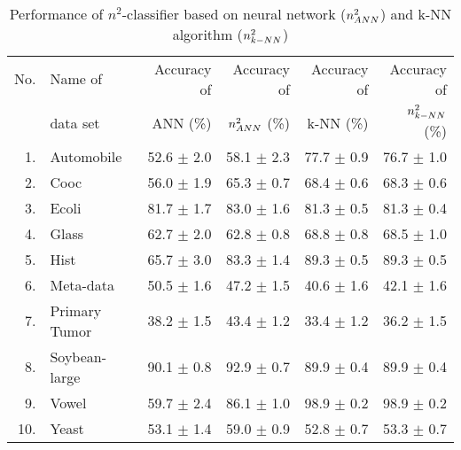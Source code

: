 \documentclass{article}
\begin{document}
\begin{table}
\caption{Performance of $n^2$-classifier based on neural network ($n^2_{\tiny ANN}$)
and k-NN algorithm ($n^2_{\tiny k-NN}$)}
\vspace{2pt}
\begin{tabular}{rlrrrr}
\hline
No. & Name of &\quad Accuracy of & Accuracy of \quad& \quad Accuracy of & Accuracy of  \\
 &data set &\quad ANN  (\%)  & $n^2_{\tiny ANN}$ (\%) & k-NN (\%) & $n^2_{\tiny k-NN}$ (\%) \\
\hline
1. & Automobile & 52.6 \scriptsize{$\pm$  2.0} & 58.1 \scriptsize{$\pm$  2.3 }&
77.7 \scriptsize{$\pm$  0.9} & 76.7 \scriptsize{$\pm$ 1.0}\\
2. & Cooc & 56.0 \scriptsize{$\pm$  1.9} & 65.3 \scriptsize{$\pm$  0.7}  &
68.4 \scriptsize{$\pm$ 0.6} & 68.3 \scriptsize{$\pm$ 0.6 } \\
3. & Ecoli & 81.7 \scriptsize{$\pm$  1.7} & 83.0 \scriptsize{$\pm$  1.6} &
81.3 \scriptsize{$\pm$ 0.5} & 81.3 \scriptsize{$\pm$ 0.4 } \\
4. & Glass & 62.7 \scriptsize{$\pm$  2.0} & 62.8 \scriptsize{$\pm$  0.8}
 & 68.8 \scriptsize{$\pm$  0.8} & 68.5 \scriptsize{$\pm$ 1.0}  \\
5. & Hist & 65.7 \scriptsize{$\pm$  3.0} & 83.3 \scriptsize{$\pm$  1.4} &
89.3 \scriptsize{$\pm$  0.5 }& 89.3 \scriptsize{$\pm$  0.5} \\
6. & Meta-data & 50.5  \scriptsize{$\pm$  1.6 }& 47.2 \scriptsize{$\pm$  1.5} &
 40.6 \scriptsize{$\pm$ 1.6 }& 42.1 \scriptsize{$\pm$  1.6 }\\
7. & Primary Tumor &  38.2 \scriptsize{$\pm$  1.5 }& 43.4 \scriptsize{$\pm$ 1.2} &
 33.4 \scriptsize{$\pm$ 1.2 }& 36.2 \scriptsize{$\pm$  1.5 } \\
8. & Soybean-large & 90.1 \scriptsize{$\pm$  0.8 }& 92.9 \scriptsize{$\pm$  0.7} &
 89.9 \scriptsize{$\pm$  0.4} & 89.9 \scriptsize{$\pm$  0.4 } \\
9. & Vowel & 59.7 \scriptsize{$\pm$  2.4} & 86.1 \scriptsize{$\pm$  1.0 }&
 98.9 \scriptsize{$\pm$  0.2 }&    98.9 \scriptsize{$\pm$  0.2 } \\
10. & Yeast &  53.1 \scriptsize{$\pm$  1.4 }& 59.0 \scriptsize{$\pm$  0.9} &
  52.8 \scriptsize{$\pm$  0.7 }&    53.3 \scriptsize{$\pm$  0.7 } \\
\hline
\end{tabular}
\end{table}
\end{document}
